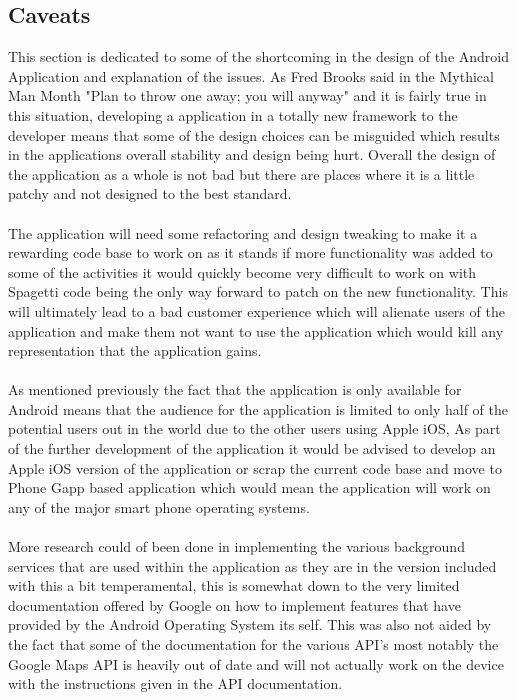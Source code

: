 \subsection{Caveats}

This section is dedicated to some of the shortcoming in the design of the Android Application and explanation of the issues. As Fred Brooks said in the Mythical Man Month \cite{fredbrooks:throwoneaway:1995:online} "Plan to throw one away; you will anyway" and it is fairly true in this situation, developing a application in a totally new framework to the developer means that some of the design choices can be misguided which results in the applications overall stability and design being hurt. Overall the design of the application as a whole is not bad but there are places where it is a little patchy and not designed to the best standard.\\
\\
The application will need some refactoring and design tweaking to make it a rewarding code base to work on as it stands if more functionality was added to some of the activities it would quickly become very difficult to work on with Spagetti code being the only way forward to patch on the new functionality. This will ultimately lead to a bad customer experience which will alienate users of the application and make them not want to use the application which would kill any representation that the application gains.\\
\\
As mentioned previously the fact that the application is only available for Android means that the audience for the application is limited to only half of the potential users out in the world due to the other users using Apple iOS, As part of the further development of the application it would be advised to develop an Apple iOS version of the application or scrap the current code base and move to Phone Gapp based application which would mean the application will work on any of the major smart phone operating systems.\\
\\
More research could of been done in implementing the various background services that are used within the application as they are in the version included with this a bit temperamental, this is somewhat down to the very limited documentation offered by Google on how to implement features that have provided by the Android Operating System its self. This was also not aided by the fact that some of the documentation for the various API's most notably the Google Maps API is heavily out of date and will not actually work on the device with the instructions given in the API documentation.

